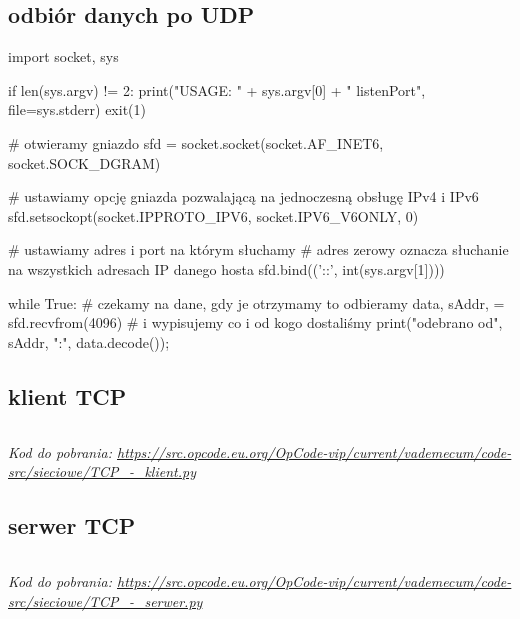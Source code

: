 \subsection{odbiór danych po UDP}
\begin{CodeFrame*}[python]{}
import socket, sys

if len(sys.argv) != 2:
  print("USAGE: " + sys.argv[0] + " listenPort", file=sys.stderr)
  exit(1)

# otwieramy gniazdo
sfd = socket.socket(socket.AF_INET6, socket.SOCK_DGRAM)

# ustawiamy opcję gniazda pozwalającą na jednoczesną obsługę IPv4 i IPv6
sfd.setsockopt(socket.IPPROTO_IPV6, socket.IPV6_V6ONLY, 0)

# ustawiamy adres i port na którym słuchamy
# adres zerowy oznacza słuchanie na wszystkich adresach IP danego hosta
sfd.bind(('::', int(sys.argv[1])))

while True:
  # czekamy na dane, gdy je otrzymamy to odbieramy
  data, sAddr, = sfd.recvfrom(4096)
  # i wypisujemy co i od kogo dostaliśmy
  print("odebrano od", sAddr, ":", data.decode());
\end{CodeFrame*}

\subsection{klient TCP}
\inputminted[frame=single,tabsize=2]{python}{vip-code-src/sieciowe/TCP_-_klient.py}
\textit{Kod do pobrania: \url{https://src.opcode.eu.org/OpCode-vip/current/vademecum/code-src/sieciowe/TCP_-_klient.py}}

\subsection{serwer TCP}
\inputminted[frame=single,tabsize=2]{python}{vip-code-src/sieciowe/TCP_-_serwer.py}
\textit{Kod do pobrania: \url{https://src.opcode.eu.org/OpCode-vip/current/vademecum/code-src/sieciowe/TCP_-_serwer.py}}

\setcounter{subsection}{0}

